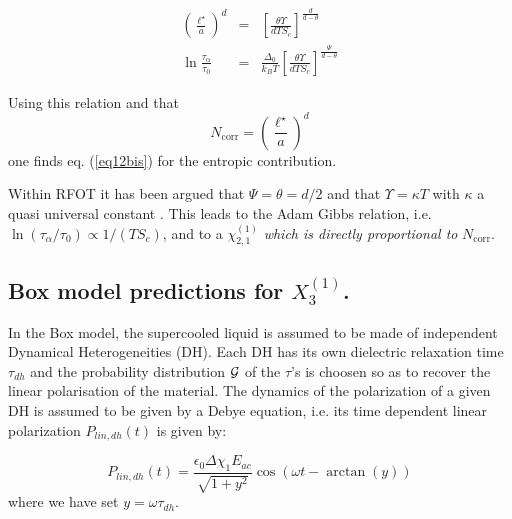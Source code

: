 \documentclass[single column,pre]{revtex4}
\begin{document}
\begin{eqnarray}
\left( \frac{\ell^{\star}}{a} \right)^d &=&  \left[ \frac{\theta \Upsilon}{d T S_c} \right]^{\frac{d}{d - \theta}} \label{eq14} \\
\ln{\frac{\tau_{\alpha}}{\tau_0}} &=& \frac{\Delta_0}{k_B T} \left[ \frac{\theta \Upsilon}{d T S_c} \right]^{\frac{\Psi}{d - \theta}} \label{eq15}
\end{eqnarray}

Using this relation and that 
$$ N_{\text{corr}} = \left( \frac{\ell^{\star}}{a} \right)^d $$
one finds eq. (\ref{eq12bis}) for the entropic contribution.  

Within RFOT it has been argued that $\Psi = \theta = d/2$ and that $\Upsilon = \kappa T$ with $\kappa$ a quasi universal constant \cite{RFOT}. This leads to the Adam Gibbs 
relation, i.e. $\ln(\tau_{\alpha} /\tau_0) \propto 1/(TS_c)$, and to a $\chi_{2,1}^{(1)}$ \textit{ which is directly proportional to} $N_{\text{corr}}$.





\subsection{\label{partA3} Box model predictions for $X_3^{(1)}$.}

In the Box model, the supercooled liquid is assumed to be made of independent Dynamical Heterogeneities (DH). Each DH has its own dielectric relaxation time $\tau_{dh}$ and the probability distribution $\cal G$ of the $\tau$'s is choosen so as to recover the linear polarisation of the material. The dynamics of the polarization of a given DH is assumed to be given by a Debye equation, i.e. its time dependent linear polarization $P_{lin,dh}(t)$ is given by:

\begin{equation}
P_{lin,dh}(t) = \frac{\epsilon_0 \Delta \chi_1 E_{ac}}{\sqrt{1+y^2}} \cos(\omega t - \arctan(y))
\label{BM1}
\end{equation}
 where we have set $y = \omega \tau_{dh}$.
 
\end{document}
